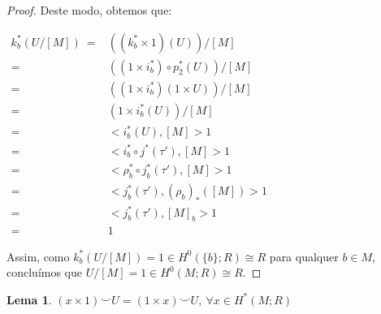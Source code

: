 \documentclass[12pt,oneside]{book} %
\newtheorem{lem}    {\hspace{0.5cm}Lema}[chapter]
\newcommand{\ccup}{\smile}
\begin{document}
\begin{proof}
	\par Deste modo, obtemos que: \newline
	
	$ \begin{array}{rl}
		k_{b}^{*}(U/[M]) \ = & \left( (k_{b}^{*}\times 1)(U) \right)/[M] \\
		= & \left( (1\times i_{b}^{*})\circ p_{2}^{*}(U) \right)/[M] \\
		= & \left( (1\times i_{b}^{*})(1\times U) \right)/[M] \\
		= & \left( 1\times i_{b}^{*}(U) \right)/[M] \\
		= & <i_{b}^{*}(U),[M]>1 \\
		= & <i_{b}^{*}\circ j^{*}(\tau'),[M]>1 \\
		= & <\rho_{b}^{*}\circ j_{b}^{*}(\tau'),[M]>1 \\
		= & <j_{b}^{*}(\tau'),(\rho_{b})_{*}([M])>1 \\
		= & <j_{b}^{*}(\tau'),[M]_{b}>1 \\
		= & 1
	\end{array} $ \newline
	
	\par Assim, como $k_{b}^{*}(U/[M])=1\in H^{0}(\{b\};R)\cong R$ para qualquer $b\in M$, concluímos que $U/[M]=1\in H^{0}(M;R)\cong R$.
	
\end{proof}

\begin{lem}
	$(x\times 1)\ccup U=(1\times x)\ccup U, \ \forall x\in H^{*}(M;R)$
\end{lem}
\end{document}
